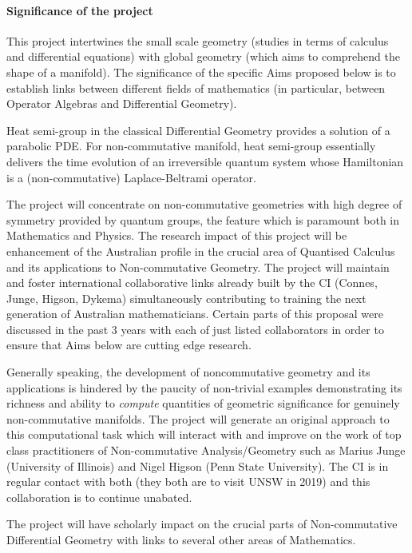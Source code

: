 \documentclass[12pt]{article}
\begin{document}
\paragraph*{Significance of the project} This project intertwines the small scale geometry (studies in terms of calculus and differential equations) with global geometry (which aims to comprehend the shape of a manifold). The significance of the specific Aims proposed below is to establish links between different fields of mathematics (in particular, between Operator Algebras and Differential Geometry).

Heat semi-group in the classical Differential Geometry provides a solution of a parabolic PDE. For non-commutative manifold, heat semi-group essentially delivers the time evolution of an irreversible quantum system whose Hamiltonian is a (non-commutative) Laplace-Beltrami operator.

The project will concentrate on non-commutative geometries with high degree of symmetry provided by quantum groups, the feature which is paramount both in Mathematics and Physics. The research impact of this project will be enhancement of the Australian profile in the crucial area of Quantised Calculus and its applications to Non-commutative Geometry. The project will maintain and foster international collaborative links already built by the CI (Connes, Junge, Higson, Dykema) simultaneously contributing to training the next generation of Australian mathematicians. Certain parts of this proposal were discussed in the past 3 years with each of just listed collaborators in order to ensure that Aims below are cutting edge research.

Generally speaking, the development of noncommutative geometry and its applications is hindered by the paucity of non-trivial examples demonstrating its richness and ability to {\it compute} quantities of geometric significance for genuinely non-commutative manifolds. The project will generate an original approach to this computational task which will interact with and improve on the work of top class practitioners of Non-commutative Analysis/Geometry such as Marius Junge (University of Illinois) and Nigel Higson (Penn State University). The CI is in regular contact with both (they both are to visit UNSW in 2019) and this collaboration is to continue unabated.

The project will have scholarly impact on the crucial parts of Non-commutative Differential Geometry with links to several other areas of Mathematics. 
\end{document}
